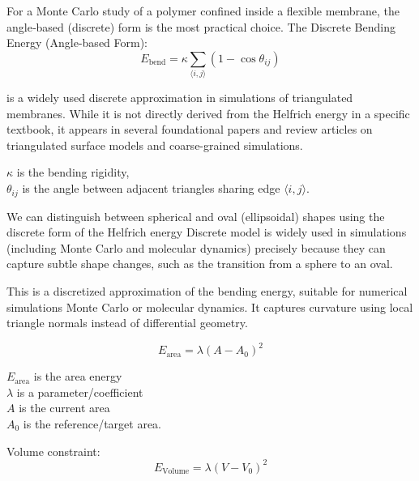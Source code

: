 \documentclass[12pt]{article}
\begin{document}
\begin{flushleft}
For a Monte Carlo study of a polymer confined inside a flexible membrane, the angle‐based (discrete) form is the most practical choice. The Discrete Bending Energy (Angle-based Form):
\begin{equation}
E_{\text{bend}} = \kappa \sum_{\langle i,j \rangle} \left(1 - \cos \theta_{ij} \right)
\end{equation}



\noindent is a widely used discrete approximation in simulations of triangulated membranes. While it is not directly derived from the Helfrich energy in a specific textbook, it appears in several foundational papers and review articles on triangulated surface models and coarse-grained simulations\cite{gompper1997triangulated}.

$\kappa$ is the bending rigidity,\\
$\theta_{ij}$ is the angle between adjacent triangles sharing edge $\langle i, j \rangle$.




We can distinguish between spherical and oval (ellipsoidal) shapes using the discrete form of the Helfrich energy
Discrete model is widely used in simulations (including Monte Carlo and molecular dynamics) precisely because they can capture subtle shape changes, such as the transition from a sphere to an oval.










This is a discretized approximation of the bending energy, suitable for numerical simulations Monte Carlo or molecular dynamics. It captures curvature using local triangle normals instead of differential geometry.


\begin{equation}
E_{\text{area}} = \lambda(A - A_0)^2
\end{equation}

$E_{\text{area}}$ is the area energy\\
$\lambda$ is a parameter/coefficient\\
$A$ is the current area\\
$A_0$ is the reference/target area.



Volume constraint:
\begin{equation}
E_{\text{Volume}} = \lambda(V - V_0)^2
\end{equation}


\end{flushleft}
\end{document}
